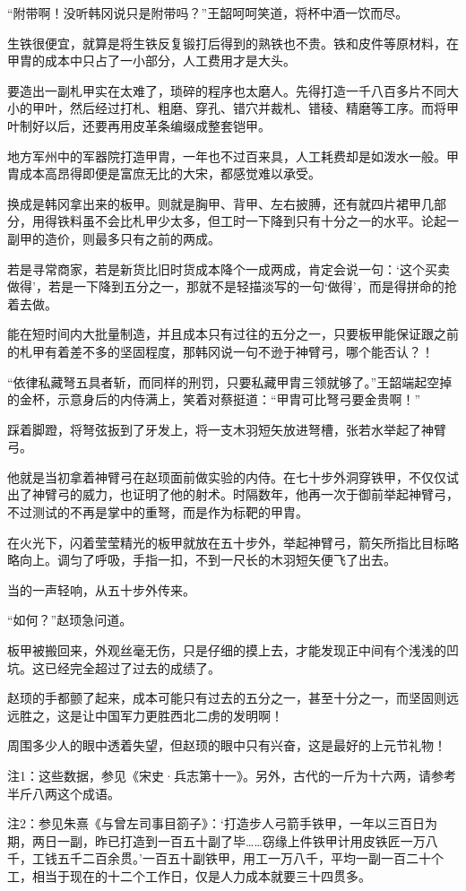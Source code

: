 “附带啊！没听韩冈说只是附带吗？”王韶呵呵笑道，将杯中酒一饮而尽。

生铁很便宜，就算是将生铁反复锻打后得到的熟铁也不贵。铁和皮件等原材料，在甲胄的成本中只占了一小部分，人工费用才是大头。

要造出一副札甲实在太难了，琐碎的程序也太磨人。先得打造一千八百多片不同大小的甲叶，然后经过打札、粗磨、穿孔、错穴并裁札、错稜、精磨等工序。而将甲叶制好以后，还要再用皮革条编缀成整套铠甲。

地方军州中的军器院打造甲胄，一年也不过百来具，人工耗费却是如泼水一般。甲胄成本高昂得即便是富庶无比的大宋，都感觉难以承受。

换成是韩冈拿出来的板甲。则就是胸甲、背甲、左右披膊，还有就四片裙甲几部分，用得铁料虽不会比札甲少太多，但工时一下降到只有十分之一的水平。论起一副甲的造价，则最多只有之前的两成。

若是寻常商家，若是新货比旧时货成本降个一成两成，肯定会说一句：‘这个买卖做得’，若是一下降到五分之一，那就不是轻描淡写的一句‘做得’，而是得拼命的抢着去做。

能在短时间内大批量制造，并且成本只有过往的五分之一，只要板甲能保证跟之前的札甲有着差不多的坚固程度，那韩冈说一句不逊于神臂弓，哪个能否认？！

“依律私藏弩五具者斩，而同样的刑罚，只要私藏甲胄三领就够了。”王韶端起空掉的金杯，示意身后的内侍满上，笑着对蔡挺道：“甲胄可比弩弓要金贵啊！”

踩着脚蹬，将弩弦扳到了牙发上，将一支木羽短矢放进弩槽，张若水举起了神臂弓。

他就是当初拿着神臂弓在赵顼面前做实验的内侍。在七十步外洞穿铁甲，不仅仅试出了神臂弓的威力，也证明了他的射术。时隔数年，他再一次于御前举起神臂弓，不过测试的不再是掌中的重弩，而是作为标靶的甲胄。

在火光下，闪着莹莹精光的板甲就放在五十步外，举起神臂弓，箭矢所指比目标略略向上。调匀了呼吸，手指一扣，不到一尺长的木羽短矢便飞了出去。

当的一声轻响，从五十步外传来。

“如何？”赵顼急问道。

板甲被搬回来，外观丝毫无伤，只是仔细的摸上去，才能发现正中间有个浅浅的凹坑。这已经完全超过了过去的成绩了。

赵顼的手都颤了起来，成本可能只有过去的五分之一，甚至十分之一，而坚固则远远胜之，这是让中国军力更胜西北二虏的发明啊！

周围多少人的眼中透着失望，但赵顼的眼中只有兴奋，这是最好的上元节礼物！

注1：这些数据，参见《宋史·兵志第十一》。另外，古代的一斤为十六两，请参考半斤八两这个成语。

注2：参见朱熹《与曾左司事目箚子》：‘打造步人弓箭手铁甲，一年以三百日为期，两日一副，昨已打造到一百五十副了毕……窃缘上件铁甲计用皮铁匠一万八千，工钱五千二百余贯。’一百五十副铁甲，用工一万八千，平均一副一百二十个工，相当于现在的十二个工作日，仅是人力成本就要三十四贯多。

